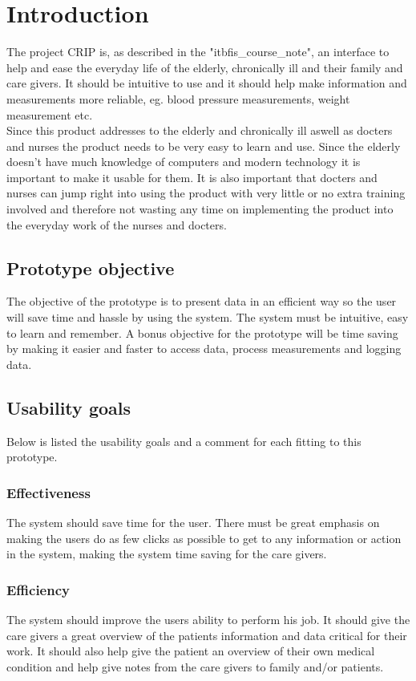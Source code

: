 \chapter{Introduction}
The project CRIP is, as described in the "itbfis\_course\_note", an interface to help and ease the everyday life of the elderly, chronically ill and their family and care givers. It should be intuitive to use and it should help make information and measurements more reliable, eg. blood pressure measurements, weight measurement  etc. \\
Since this product addresses to the elderly and chronically ill aswell as docters and nurses the product needs to be very easy to learn and use. Since the elderly doesn't have much knowledge of computers and modern technology it is important to make it usable for them. It is also important that docters and nurses can jump right into using the product with very little or no extra training involved and therefore not wasting any time on implementing the product into the everyday work of the nurses and docters.\\

\section{Prototype objective}
The objective of the prototype is to present data in an efficient way so the user will save time and hassle by using the system. The system must be intuitive, easy to learn and remember. A bonus objective for the prototype will be time saving by making it easier and faster to access data, process measurements and logging data. 

\section{Usability goals}
Below is listed the usability goals and a comment for each fitting to this prototype.
\subsection{Effectiveness}
The system should save time for the user. There must be great emphasis on making the users do as few clicks as possible to get to any information or action in the system, making the system time saving for the care givers.

\subsection{Efficiency}
The system should improve the users ability to perform his job. It should give the care givers a great overview of the patients information and data critical for their work. It should also help give the patient an overview of their own medical condition and help give notes from the care givers to family and/or patients.

